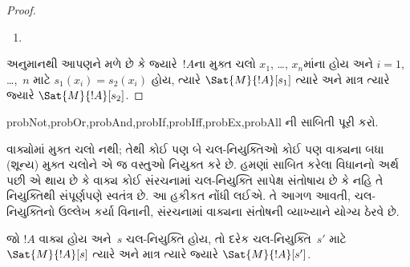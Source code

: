 \begin{proof}
\begin{enumerate}
\item %
\end{enumerate}
અનુમાનથી આપણને મળે છે કે જ્યારે~$!A$ના મુક્ત ચલો
$x_1$, \dots, $x_n$માંના હોય અને $i=1$, \dots,~$n$ માટે
$s_1(x_i)=s_2(x_i)$ હોય, ત્યારે $\Sat{M}{!A}[s_1]$ ત્યારે અને માત્ર
ત્યારે જ્યારે $\Sat{M}{!A}[s_2]$.
\end{proof}

\begin{probtag}{probNot,probOr,probAnd,probIf,probIff,probEx,probAll}
ની સાબિતી પૂરી કરો.
\end{probtag}

\begin{explain}
વાક્યોમાં મુક્ત ચલો નથી; તેથી કોઈ પણ બે ચલ-નિયુક્તિઓ કોઈ પણ
વાક્યના બધા (શૂન્ય) મુક્ત ચલોને એ જ વસ્તુઓ નિયુક્ત કરે છે. હમણાં
સાબિત કરેલા વિધાનનો અર્થ પછી એ થાય છે કે વાક્ય કોઈ સંરચનામાં
ચલ-નિયુક્તિ સાપેક્ષ સંતોષાય છે કે નહિ તે નિયુક્તિથી સંપૂર્ણપણે
સ્વતંત્ર છે. આ હકીકત નોંધી લઈએ. તે આગળ આવતી, ચલ-નિયુક્તિનો ઉલ્લેખ
કર્યા વિનાની, સંરચનામાં વાક્યના સંતોષની વ્યાખ્યાને
યોગ્ય ઠેરવે છે.
\end{explain}

\begin{cor}
જો $!A$ વાક્ય હોય અને~$s$ ચલ-નિયુક્તિ હોય, તો દરેક
ચલ-નિયુક્તિ~$s'$ માટે $\Sat{M}{!A}[s]$ ત્યારે અને માત્ર ત્યારે જ્યારે
$\Sat{M}{!A}[s']$.
\end{cor}

